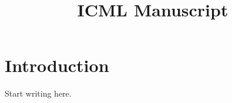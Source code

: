 \documentclass{article}
\title{ICML Manuscript}
\author{}
\date{}
\begin{document}
\maketitle
\section{Introduction}
Start writing here.


\end{document}
